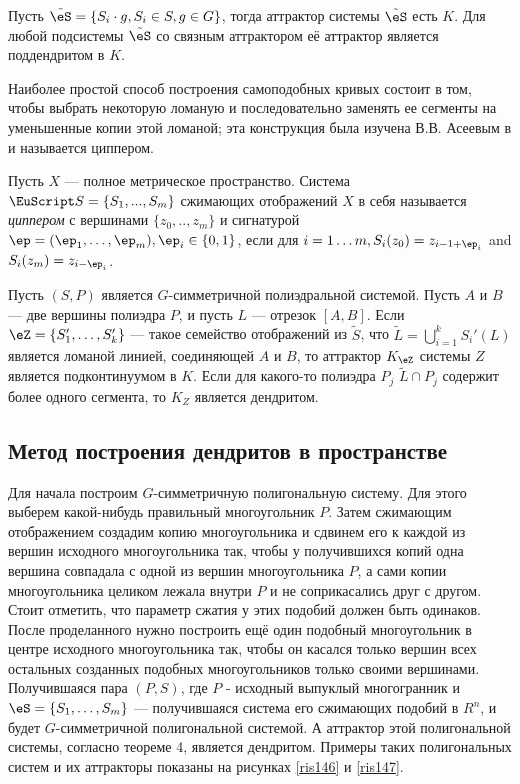 \begin{corollary}
Пусть $\tilde{\eS}=\{S_i\cdot g, S_i\in S, g\in G\}$, тогда аттрактор системы $\tilde{\eS}$ есть $K$. Для любой подсистемы $\tilde{\eS}$ со связным аттрактором её аттрактор является поддендритом в $K$.
\end{corollary}

Наиболее простой способ построения самоподобных кривых состоит в том, чтобы выбрать некоторую ломаную и последовательно заменять ее сегменты на уменьшенные копии этой ломаной; эта конструкция  была изучена В.В.
Асеевым в \cite{ATK} и называется циппером.

\begin{definition}
 Пусть $X$ --- полное метрическое пространство.
Система $\EuScript S=\{S_1,...,S_m\}$ сжимающих отображений $X$ в
себя называется {\em циппером} с вершинами $\{z_0,..,z_m\}$ и сигнатурой
$\ep = (\ep_1, \ldots, \ep_m), \ep_i \in\{0,1\}$, если для $ i = 1\ldots m, S_i
(z_0) = z_{i-1+\ep_i}$ and $S_i (z_m) = z_{i-{\ep_i}}$.
\end{definition}

\begin{theorem}\label{zip1}
Пусть $(S,P)$ является $G$-симметричной полиэдральной системой. Пусть $A$ и $B$--- две вершины полиэдра $P$, и пусть $L$ --- отрезок $[A,B]$. Если $\eZ=\{S_1',\ldots,S_k'\}$ --- такое семейство отображений из $\tilde{S}$, что $\tilde{L}=\bigcup_{i=1}^k S_i'(L)$ является ломаной линией, соединяющей $A$ и $B$, то аттрактор $K_\eZ$ системы $Z$ является подконтинуумом в $K$. Если для какого-то полиэдра $P_j$ $\tilde{L}\cap P_j$ содержит более одного сегмента, то $K_Z$ является дендритом.
\end{theorem}



\subsection{Метод построения дендритов в пространстве}%

Для начала построим $G$-симметричную полигональную систему. Для этого выберем какой-нибудь правильный многоугольник $P$. Затем сжимающим отображением создадим копию многоугольника и сдвинем его к каждой из вершин исходного многоугольника так, чтобы у получившихся копий одна вершина совпадала с одной из вершин многоугольника $P$, а сами копии многоугольника целиком лежала внутри $P$ и не соприкасались друг с другом. Стоит отметить, что параметр сжатия у этих подобий должен быть одинаков. После проделанного нужно построить ещё один подобный многоугольник в центре исходного многоугольника так, чтобы он касался только вершин всех остальных созданных подобных многоугольников только своими вершинами. Получившаяся пара $(P,S)$, где $P$ - исходный выпуклый многогранник и $\eS = \{S_1,\ldots,S_m\}$ — получившаяся система его сжимающих подобий в $R^n$, и будет $G$-симметричной полигональной системой. А аттрактор этой полигональной системы, согласно теореме 4, является дендритом. Примеры таких полигональных систем и их аттракторы показаны на рисунках \ref{ris146} и \ref{ris147}.


